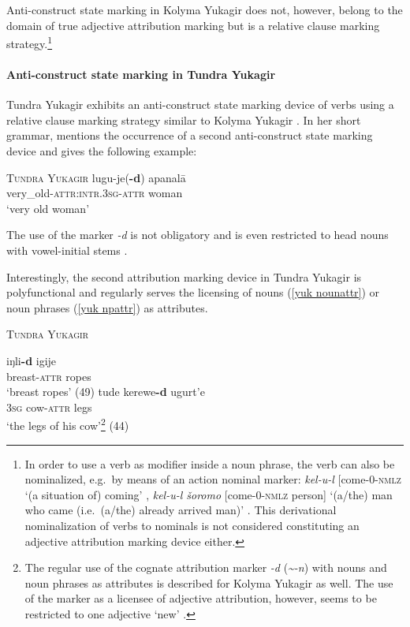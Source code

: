 Anti-construct state marking in Kolyma Yukagir does not, however, belong to the domain of true adjective attribution marking but is a relative clause marking strategy.\footnote{In order to use a verb as modifier inside a noun phrase, the verb can also be nominalized, e.g.~by means of an action nominal marker: \textit{kel-u-l} [come-0-\textsc{nmlz} ‘(a situation of) coming’ \cite[147]{maslova2003b}, \textit{kel-u-l šoromo} [come-0-\textsc{nmlz} person] ‘(a/the) man who came (i.e.~(a/the) already arrived man)’ \cite[67]{maslova2003b}. This derivational nominalization of verbs to nominals is not considered constituting an adjective attribution marking device either.}

\paragraph{Anti-construct state marking in Tundra Yukagir}
Tundra Yukagir exhibits an anti-construct state marking device of verbs using a relative clause marking strategy similar to Kolyma Yukagir \citep[49–50, elsewhere]{maslova2003a}. In her short grammar, \cite{maslova2003a} mentions the occurrence of a second anti-construct state marking device and gives the following example:
\begin{exe}
\ex 	\textsc{Tundra Yukagir} \citep[50]{maslova2003a}
\gll 	lugu-je(\textbf{-d}) apanalā\\
	very\_old-\textsc{attr:intr.3sg}-\textsc{attr} woman\\
\glt	‘very old woman’
\end{exe}
The use of the marker \textit{-d} is not obligatory and is even restricted to head nouns with vowel-initial stems \cite[50]{maslova2003a}.

Interestingly, the second attribution marking device in Tundra Yukagir is polyfunctional and regularly serves the licensing of nouns (\ref{yuk nounattr}) or noun phrases (\ref{yuk npattr}) as attributes.
\begin{exe}
\ex \textsc{Tundra Yukagir} \citep{maslova2003a}
\begin{xlist}
\ex \label{yuk nounattr}
\gll	iŋli\textbf{-d} igije\\
	breast-\textsc{attr} ropes\\
\glt	‘breast ropes’ (49)
\ex \label{yuk npattr}
\gll	tude kerewe\textbf{-d} ugurt'e\\
	\textsc{3sg} cow-\textsc{attr} legs\\
\glt	‘the legs of his cow’\footnote{The regular use of the cognate attribution marker \textit{-d} (\textit{\textasciitilde-n}) with nouns and noun phrases as attributes is described for Kolyma Yukagir as well. The use of the marker as a licensee of adjective attribution, however, seems to be restricted to one adjective ‘new’ \citep[71]{maslova2003b}.} (44)
\end{xlist}
\end{exe}

